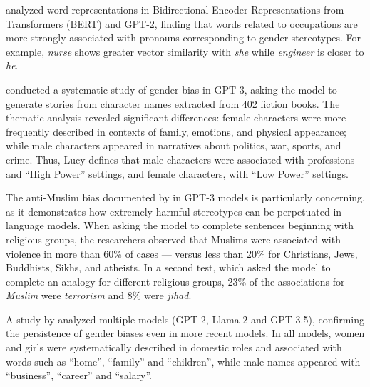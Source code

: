 \documentclass[jair,11pt,letterpaper]{article}
\begin{document}
 analyzed word representations in Bidirectional Encoder Representations from Transformers (BERT) and
GPT-2, finding that words related to occupations are more
strongly associated with pronouns corresponding to gender
stereotypes. For example, \textit{nurse} shows greater vector similarity with
\textit{she} while \textit{engineer} is closer to \textit{he}.

 conducted a systematic study of gender bias
in GPT-3, asking the model to generate stories from character names
extracted from 402 fiction books. The thematic analysis
revealed significant differences: female characters were more
frequently described in contexts of family, emotions, and physical
appearance; while male characters appeared in narratives about
politics, war, sports, and crime.
Thus, Lucy defines that male characters
were associated with professions and ``High Power'' settings, and
female characters, with ``Low Power'' settings.

The anti-Muslim bias documented by  in
GPT-3 models is particularly concerning, as it demonstrates how
extremely harmful stereotypes can be perpetuated in language models. When
asking the model to complete sentences beginning with religious
groups, the researchers observed that Muslims were associated with
violence in more than 60\% of cases --- versus less than 20\% for
Christians, Jews, Buddhists, Sikhs, and atheists. In a second test, which
asked the model to complete an analogy for different
religious groups, 23\% of the associations for \textit{Muslim} were \textit{terrorism} and 8\% were
\textit{jihad}.

A study by  analyzed multiple models (GPT-2, Llama 2 and
GPT-3.5), confirming the persistence of gender biases even in
more recent models. In all models, women and girls were
systematically described in domestic roles and associated with words
such as ``home'', ``family'' and ``children'', while male names
appeared with ``business'', ``career'' and ``salary''.
\end{document}
